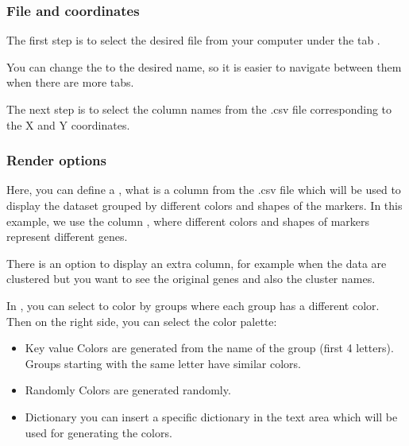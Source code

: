 \documentclass[letterpaper,10pt,english,openany,oneside]{sphinxmanual}
\begin{document}
\subsubsection{File and coordinates}
\label{\detokenize{docs/starting/markers:file-and-coordinates}}
\sphinxAtStartPar
The first step is to select the desired file from your computer under the tab .

\sphinxAtStartPar
{}

\sphinxAtStartPar
You can change the  to the desired name, so it is easier to navigate between them when there are more tabs.

\sphinxAtStartPar
{}

\sphinxAtStartPar
The next step is to select the column names from the .csv file corresponding to the X and Y coordinates.

\sphinxAtStartPar
{}


\subsubsection{Render options}
\label{\detokenize{docs/starting/markers:render-options}}
\sphinxAtStartPar
Here, you can define a , what is a column from the .csv file which will be used to display the dataset grouped by different colors and shapes of the markers. In this example, we use the column , where different colors and shapes of markers represent different genes.

\sphinxAtStartPar
{}

\sphinxAtStartPar
There is an option to display an extra column, for example when the data are clustered but you want to see the original genes and also the cluster names.

\sphinxAtStartPar
{}

\sphinxAtStartPar
In , you can select to color by groups where each group has a different color. Then on the right side, you can select the color palette:
\begin{itemize}
\item {} 
\sphinxAtStartPar
Key value \sphinxhyphen{} Colors are generated from the name of the group (first 4 letters). Groups starting with the same letter have similar colors.

\item {} 
\sphinxAtStartPar
Randomly \sphinxhyphen{} Colors are generated randomly.

\item {} 
\sphinxAtStartPar
Dictionary \sphinxhyphen{} you can insert a specific dictionary in the text area which will be used for generating the colors.

\end{itemize}
\end{document}
